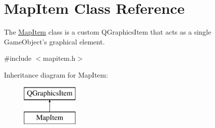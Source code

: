 \hypertarget{classMapItem}{\section{Map\-Item Class Reference}
\label{classMapItem}
}


The \hyperlink{classMapItem}{Map\-Item} class is a custom Q\-Graphics\-Item that acts as a single Game\-Object's graphical element.  




{\ttfamily \#include $<$mapitem.\-h$>$}

Inheritance diagram for Map\-Item\-:\begin{figure}[H]
\begin{center}
\leavevmode
\includegraphics[height=2.000000cm]{classMapItem}
\end{center}
\end{figure}
